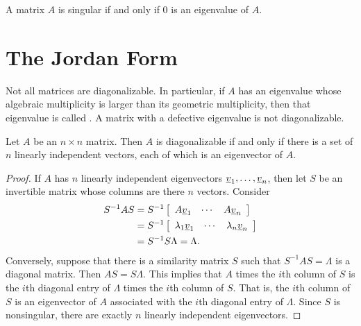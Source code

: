 A matrix $A$ is singular if and only if $0$ is an eigenvalue of $A$.

\section{The Jordan Form}

Not all matrices are diagonalizable.
In particular, if $A$ has an eigenvalue whose algebraic multiplicity is larger than its geometric multiplicity, then that eigenvalue is called .
A matrix with a defective eigenvalue is not diagonalizable.

\begin{theorem}
Let $A$ be an $n \times n$ matrix.
Then $A$ is diagonalizable if and only if there is a set of $n$ linearly independent vectors, each of which is an eigenvector of $A$.
\end{theorem}

\begin{proof}
If $A$ has $n$ linearly independent eigenvectors $\underline{v}_1, \ldots, \underline{v}_n$, then let $S$ be an invertible matrix whose columns are there $n$ vectors.
Consider
\begin{equation*}
\begin{split}
S^{-1} A S &= S^{-1} \left[ \begin{array}{ccc} A \underline{v}_1 & \cdots & A \underline{v}_n \end{array} \right] \\
&= S^{-1} \left[ \begin{array}{ccc} \lambda_1 \underline{v}_1 & \cdots & \lambda_n \underline{v}_n \end{array} \right] \\
&= S^{-1} S \Lambda = \Lambda .
\end{split}
\end{equation*}
Conversely, suppose that there is a similarity matrix $S$ such that $S^{-1} A S = \Lambda$ is a diagonal matrix.
Then $A S = S \Lambda$.
This implies that $A$ times the $i$th column of $S$ is the $i$th diagonal entry of $\Lambda$ times the $i$th column of $S$.
That is, the $i$th column of $S$ is an eigenvector of $A$ associated with the $i$th diagonal entry of $\Lambda$.
Since $S$ is nonsingular, there are exactly $n$ linearly independent eigenvectors.
\end{proof}

